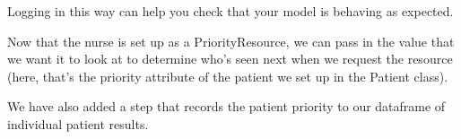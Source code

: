 \documentclass[
  letterpaper,
  DIV=11,
  numbers=noendperiod]{scrreprt}
\begin{document}
\begin{tcolorbox}[enhanced jigsaw, rightrule=.15mm, colback=white, colframe=quarto-callout-tip-color-frame, colbacktitle=quarto-callout-tip-color!10!white, toprule=.15mm, coltitle=black, opacityback=0, titlerule=0mm, bottomtitle=1mm, breakable, title=\textcolor{quarto-callout-tip-color}{\faLightbulb}\hspace{0.5em}{Tip}, opacitybacktitle=0.6, toptitle=1mm, arc=.35mm, bottomrule=.15mm, leftrule=.75mm, left=2mm]

Logging in this way can help you check that your model is behaving as
expected.

\end{tcolorbox}

Now that the nurse is set up as a PriorityResource, we can pass in the
value that we want it to look at to determine who's seen next when we
request the resource (here, that's the priority attribute of the patient
we set up in the Patient class).

We have also added a step that records the patient priority to our
dataframe of individual patient results.
\end{document}
